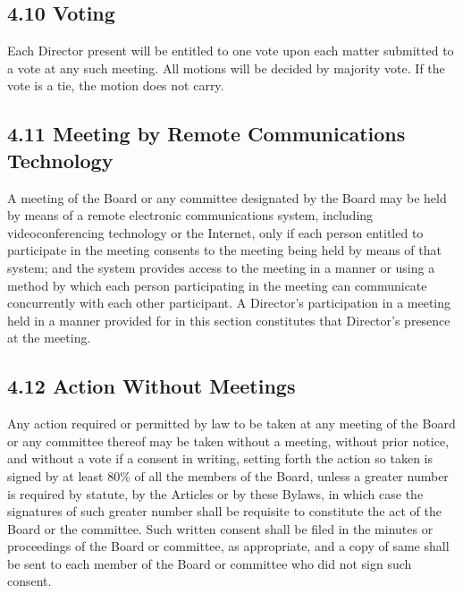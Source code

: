 \documentclass[
]{book}
\begin{document}
\subsection*{4.10 Voting}\label{voting}

Each Director present will be entitled to one vote upon each matter submitted to a vote at any such meeting. All motions will be decided by majority vote. If the vote is a tie, the motion does not carry.

\subsection*{4.11 Meeting by Remote Communications Technology}\label{meeting-by-remote-communications-technology}

A meeting of the Board or any committee designated by the Board may be held by means of a remote electronic communications system, including videoconferencing technology or the Internet, only if each person entitled to participate in the meeting consents to the meeting being held by means of that system; and the system provides access to the meeting in a manner or using a method by which each person participating in the meeting can communicate concurrently with each other participant. A Director's participation in a meeting held in a manner provided for in this section constitutes that Director's presence at the meeting.

\subsection*{4.12 Action Without Meetings}\label{action-without-meetings}

Any action required or permitted by law to be taken at any meeting of the Board or any committee thereof may be taken without a meeting, without prior notice, and without a vote if a consent in writing, setting forth the action so taken is signed by at least 80\% of all the members of the Board, unless a greater number is required by statute, by the Articles or by these Bylaws, in which case the signatures of such greater number shall be requisite to constitute the act of the Board or the committee. Such written consent shall be filed in the minutes or proceedings of the Board or committee, as appropriate, and a copy of same shall be sent to each member of the Board or committee who did not sign such consent.
\end{document}
